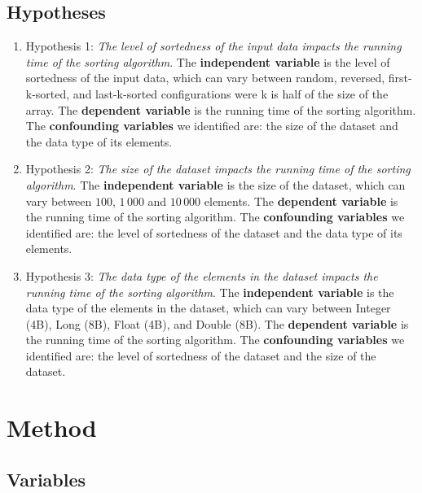 \documentclass[unicode,11pt,a4paper,oneside,numbers=endperiod,openany]{scrartcl}
\begin{document}
    \subsection{Hypotheses}

    \begin{enumerate}
        \item Hypothesis 1: \textit{ The level of sortedness of the input data impacts the running time of the sorting algorithm}. The \textbf{independent variable} is the level of sortedness of the input data, which can vary between random, reversed, first-k-sorted, and last-k-sorted configurations were k is half of the size of the array. The \textbf{dependent variable} is the running time of the sorting algorithm. The \textbf{confounding variables} we identified are: the size of the dataset and the data type of its elements. 

        \item Hypothesis 2: \textit{The size of the dataset impacts the running time of the sorting algorithm}. The \textbf{independent variable} is the size of the dataset, which can vary between $100$, $1\,000$ and $10\,000$ elements. The \textbf{dependent variable} is the running time of the sorting algorithm. The \textbf{confounding variables} we identified are: the level of sortedness of the dataset and the data type of its elements. 

        \item Hypothesis 3: \textit{The data type of the elements in the dataset impacts the running time of the sorting algorithm}. The \textbf{independent variable} is the data type of the elements in the dataset, which can vary between Integer (4B), Long (8B), Float (4B), and Double (8B). The \textbf{dependent variable} is the running time of the sorting algorithm. The \textbf{confounding variables} we identified are: the level of sortedness of the dataset and the size of the dataset.

    \end{enumerate}

\section{Method}

    \subsection{Variables}
\end{document}
